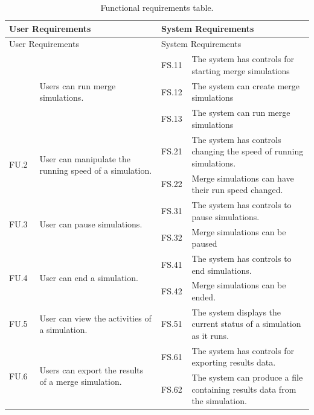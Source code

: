\begin{longtable}{|p{0.1\linewidth}|p{0.4\linewidth}|p{0.1\linewidth}|p{0.4\linewidth}|}
\caption{Functional requirements table.}\label{tab:functionalRequirements}\\
\hline
\multicolumn{2}{|l|}{User Requirements} & \multicolumn{2}{l|}{System Requirements} \\
\hline
\endfirsthead

\hline
\multicolumn{2}{|l|}{User Requirements} & \multicolumn{2}{l|}{System Requirements} \\
\hline
\endhead

\hline
\endfoot

\hline
\endlastfoot

\multirow{3}{*}{FU.1} & \multirow{3}{*}{\parbox{\linewidth}{Users can run merge simulations.}} 
 & FS.11 & The system has controls for starting merge simulations \\
 &  & FS.12 & The system can create merge simulations \\
 &  & FS.13 & The system can run merge simulations \\
\hline
\multirow{2}{*}{FU.2} & \multirow{2}{*}{\parbox{\linewidth}{User can manipulate the running speed of a simulation.}}
 & FS.21 & The system has controls changing the speed of running simulations. \\
 &  & FS.22 & Merge simulations can have their run speed changed. \\ 
\hline
\multirow{2}{*}{FU.3} & \multirow{2}{*}{\parbox{\linewidth}{User can pause simulations.}}
 & FS.31 & The system has controls to pause simulations. \\
 &  & FS.32 & Merge simulations can be paused \\ 
\hline
\multirow{2}{*}{FU.4} & \multirow{2}{*}{\parbox{\linewidth}{User can end a simulation.}}
 & FS.41 & The system has controls to end simulations. \\
 &  & FS.42 & Merge simulations can be ended. \\ 
\hline
FU.5 & User can view the activities of a simulation. & FS.51 & The system displays the current status of a simulation as it runs. \\
\hline
\multirow{9}{*}{FU.6} & \multirow{9}{*}{\parbox{\linewidth}{Users can export the results of a merge simulation.}}
 & FS.61 & The system has controls for exporting results data. \\
 &  & FS.62 & The system can produce a file containing results data from the simulation. \\

\end{longtable}
